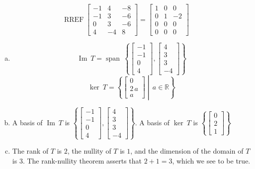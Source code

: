 \begin{exerciseAnswer} 


\[\operatorname{RREF} \left[\begin{array}{ccc}
-1 & 4 & -8 \\
-1 & 3 & -6 \\
0 & 3 & -6 \\
4 & -4 & 8
\end{array}\right] = \left[\begin{array}{ccc}
1 & 0 & 0 \\
0 & 1 & -2 \\
0 & 0 & 0 \\
0 & 0 & 0
\end{array}\right] \]


\begin{enumerate}[(a)]
\item \[\operatorname{Im}\ T = \operatorname{span}\  \left\{ \left[\begin{array}{c}
-1 \\
-1 \\
0 \\
4
\end{array}\right] , \left[\begin{array}{c}
4 \\
3 \\
3 \\
-4
\end{array}\right] \right\} \]\[\operatorname{ker}\ T =  \left\{ \left[\begin{array}{c}
0 \\
2 \, a \\
a
\end{array}\right] \middle|\,a\in\mathbb{R}\right\} \]
\item  A basis of \(\operatorname{Im}\ T\) is \( \left\{ \left[\begin{array}{c}
-1 \\
-1 \\
0 \\
4
\end{array}\right] , \left[\begin{array}{c}
4 \\
3 \\
3 \\
-4
\end{array}\right] \right\} \). A basis of \(\operatorname{ker}\ T\) is \( \left\{ \left[\begin{array}{c}
0 \\
2 \\
1
\end{array}\right] \right\} \)
\item  The rank of \(T\) is \( 2 \), the nullity of \(T\) is \( 1 \), and the dimension of the domain of \(T\) is \( 3 \). The rank-nullity theorem asserts that \( 2 + 1 = 3 \), which we see to be true. 
\end{enumerate}
    
\end{exerciseAnswer}
    
